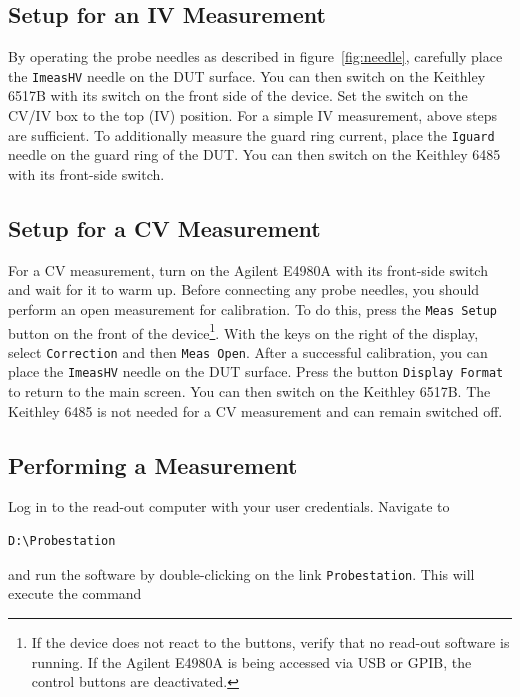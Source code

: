 \documentclass[a4paper]{article}
\begin{document}
\subsection{Setup for an IV Measurement}
\label{sec:ivsetup}

By operating the probe needles as described in figure~\ref{fig:needle}, carefully place the {\tt ImeasHV} needle on the DUT surface.
You can then switch on the Keithley 6517B with its switch on the front side of the device.
Set the switch on the CV/IV box to the top (IV) position.
For a simple IV measurement, above steps are sufficient.
To additionally measure the guard ring current, place the {\tt Iguard} needle on the guard ring of the DUT.
You can then switch on the Keithley 6485 with its front-side switch.\\

\subsection{Setup for a CV Measurement}
\label{sec:cvsetup}

For a CV measurement, turn on the Agilent E4980A with its front-side switch and wait for it to warm up.
Before connecting any probe needles, you should perform an open measurement for calibration.
To do this, press the {\tt Meas Setup} button on the front of the device\footnote{If the device does not react to the buttons, verify that no read-out software is running. If the Agilent E4980A is being accessed via USB or GPIB, the control buttons are deactivated.}.
With the keys on the right of the display, select {\tt Correction} and then {\tt Meas Open}.
After a successful calibration, you can place the {\tt ImeasHV} needle on the DUT surface.
Press the button {\tt Display Format} to return to the main screen.
You can then switch on the Keithley 6517B.
The Keithley 6485 is not needed for a CV measurement and can remain switched off.\\

\subsection{Performing a Measurement}
\label{sec:ivmeas}

Log in to the read-out computer with your user credentials.
Navigate to

\begin{lstlisting}
D:\Probestation
\end{lstlisting}

and run the software by double-clicking on the link {\tt Probestation}.
This will execute the command
\end{document}
